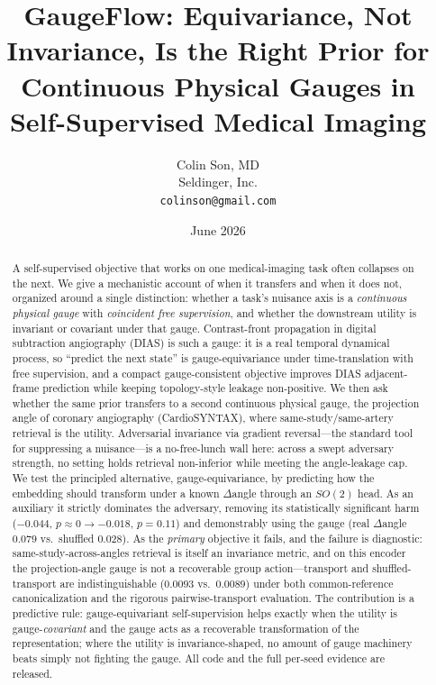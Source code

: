 \documentclass[11pt]{article}
\title{GaugeFlow: Equivariance, Not Invariance, Is the Right Prior for\\
Continuous Physical Gauges in Self-Supervised Medical Imaging}
\author{Colin Son, MD\\ Seldinger, Inc.\\ \texttt{colinson@gmail.com}}
\date{June 2026}
\begin{document}
\maketitle

\begin{abstract}
A self-supervised objective that works on one medical-imaging task often collapses on the next.
We give a mechanistic account of when it transfers and when it does not, organized around a single
distinction: whether a task's nuisance axis is a \emph{continuous physical gauge} with
\emph{coincident free supervision}, and whether the downstream utility is invariant or covariant
under that gauge. Contrast-front propagation in digital subtraction angiography (DIAS) is such a
gauge: it is a real temporal dynamical process, so ``predict the next state'' is gauge-equivariance
under time-translation with free supervision, and a compact gauge-consistent objective improves
DIAS adjacent-frame prediction while keeping topology-style leakage non-positive. We then ask
whether the same prior transfers to a second continuous physical gauge, the projection angle of
coronary angiography (CardioSYNTAX), where same-study/same-artery retrieval is the utility.
Adversarial invariance via gradient reversal---the standard tool for suppressing a nuisance---is a
no-free-lunch wall here: across a swept adversary strength, no setting holds retrieval non-inferior
while meeting the angle-leakage cap. We test the principled alternative, gauge-equivariance, by
predicting how the embedding should transform under a known $\Delta$angle through an $SO(2)$ head.
As an auxiliary it strictly dominates the adversary, removing its statistically significant harm
($-0.044$, $p\!\approx\!0 \to -0.018$, $p=0.11$) and demonstrably using the gauge (real
$\Delta$angle $0.079$ vs.\ shuffled $0.028$). As the \emph{primary} objective it fails, and the
failure is diagnostic: same-study-across-angles retrieval is itself an invariance metric, and on
this encoder the projection-angle gauge is not a recoverable group action---transport and
shuffled-transport are indistinguishable ($0.0093$ vs.\ $0.0089$) under both common-reference
canonicalization and the rigorous pairwise-transport evaluation. The contribution is a predictive
rule: gauge-equivariant self-supervision helps exactly when the utility is gauge-\emph{covariant}
and the gauge acts as a recoverable transformation of the representation; where the utility is
invariance-shaped, no amount of gauge machinery beats simply not fighting the gauge. All code and
the full per-seed evidence are released.
\end{abstract}
\end{document}
